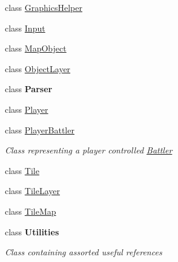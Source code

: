 \begin{DoxyCompactItemize}
class \hyperlink{class_simple_r_p_g_1_1_graphics_helper}{Graphics\-Helper}
\item 
class \hyperlink{class_simple_r_p_g_1_1_input}{Input}
\item 
class \hyperlink{class_simple_r_p_g_1_1_map_object}{Map\-Object}
\item 
class \hyperlink{class_simple_r_p_g_1_1_object_layer}{Object\-Layer}
\item 
class {\bfseries Parser}
\item 
class \hyperlink{class_simple_r_p_g_1_1_player}{Player}
\item 
class \hyperlink{class_simple_r_p_g_1_1_player_battler}{Player\-Battler}
\begin{DoxyCompactList}\small\item\em Class representing a player controlled \hyperlink{class_simple_r_p_g_1_1_battler}{Battler} \end{DoxyCompactList}\item 
class \hyperlink{class_simple_r_p_g_1_1_tile}{Tile}
\item 
class \hyperlink{class_simple_r_p_g_1_1_tile_layer}{Tile\-Layer}
\item 
class \hyperlink{class_simple_r_p_g_1_1_tile_map}{Tile\-Map}
\item 
class {\bfseries Utilities}
\begin{DoxyCompactList}\small\item\em Class containing assorted useful references \end{DoxyCompactList}\end{DoxyCompactItemize}
